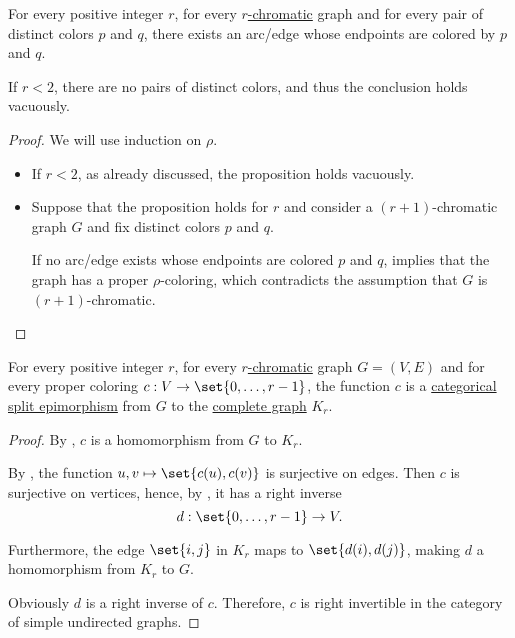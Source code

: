 \begin{proposition}\label{thm:chromatic_number_color_pairs}
  For every positive integer \( r \), for every \hyperref[def:graph_chromatic_number]{\( r \)-chromatic} graph and for every pair of distinct colors \( p \) and \( q \), there exists an arc/edge whose endpoints are colored by \( p \) and \( q \).
\end{proposition}
\begin{comments}
  \item If \( r < 2 \), there are no pairs of distinct colors, and thus the conclusion holds vacuously.
\end{comments}
\begin{proof}
  We will use induction on \( \rho \).
  \begin{itemize}
    \item If \( r < 2 \), as already discussed, the proposition holds vacuously.

    \item Suppose that the proposition holds for \( r \) and consider a \( (r + 1) \)-chromatic graph \( G \) and fix distinct colors \( p \) and \( q \).

    If no arc/edge exists whose endpoints are colored \( p \) and \( q \),  implies that the graph has a proper \( \rho \)-coloring, which contradicts the assumption that \( G \) is \( (r + 1) \)-chromatic.
  \end{itemize}
\end{proof}

\begin{corollary}\label{thm:chromatic_number_coloring_splits}
  For every positive integer \( r \), for every \hyperref[def:graph_chromatic_number]{\( r \)-chromatic} graph \( G = (V, E) \) and for every proper coloring \( c: V \to \set{ 0, \ldots, r - 1 } \), the function \( c \) is a \hyperref[def:morphism_invertibility/right_cancellative]{categorical split epimorphism} from \( G \) to the \hyperref[def:complete_graph]{complete graph} \( K_r \).
\end{corollary}
\begin{proof}
  By , \( c \) is a homomorphism from \( G \) to \( K_r \).

  By , the function \( { u, v } \mapsto \set{ c(u), c(v) } \) is surjective on edges. Then \( c \) is surjective on vertices, hence, by , it has a right inverse
  \begin{equation*}
    d: \set{ 0, \ldots, r - 1 } \to V.
  \end{equation*}

  Furthermore, the edge \( \set{ i, j } \) in \( K_r \) maps to \( \set{ d(i), d(j) } \), making \( d \) a homomorphism from \( K_r \) to \( G \).

  Obviously \( d \) is a right inverse of \( c \). Therefore, \( c \) is right invertible in the category of simple undirected graphs.
\end{proof}

